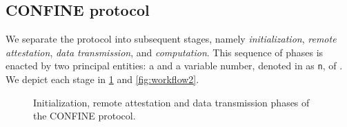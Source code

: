 \subsection{CONFINE protocol}

We separate the protocol into subsequent stages, namely \textit{initialization}, \textit{remote attestation}, \textit{data transmission}, and \textit{computation}. This sequence of phases is enacted by two principal entities: a  and a variable number, denoted in as \texttt{n}, of . We depict each stage in \cref{fig:workflow} and \cref{fig:workflow2}.

\begin{figure}[t]
	\hfill
	\hfill
	\hfill
	\caption{Initialization, remote attestation and data transmission phases of the CONFINE protocol.}
	\label{fig:workflow}
\end{figure}
